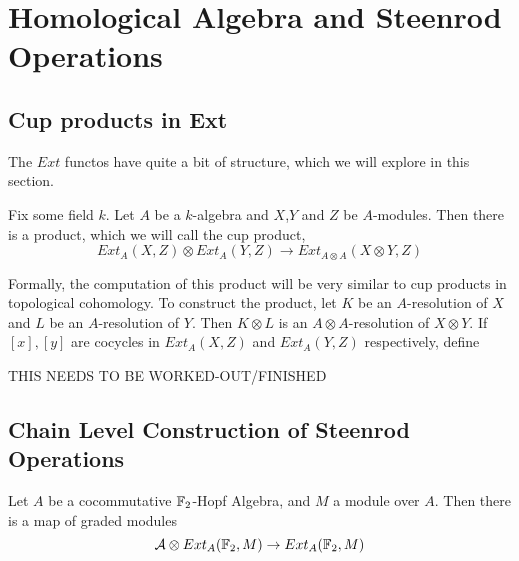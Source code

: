 

\section{Homological Algebra and Steenrod Operations}

\subsection{Cup products in Ext}
\label{sec:ExtStructure}

The $Ext$ functos have quite a bit of structure, which we will explore in this section.  

Fix some field $k$. 
Let $A$ be a $k$-algebra and $X$,$Y$ and $Z$ be $A$-modules.
Then there is a product, which we will call the cup product, 
\[Ext_A(X,Z)\otimes Ext_A(Y,Z)\to Ext_{A\otimes A}(X\otimes Y,Z)\]

Formally, the computation of this product will be very similar to cup products in topological cohomology.  
To construct the product, let $K$ be an  $A$-resolution of $X$ and $L$ be an  $A$-resolution of $Y$.  
Then $K\otimes L$ is an $A\otimes A$-resolution of $X\otimes Y$.  
If $[x],[y]$ are cocycles in $Ext_A(X,Z)$ and $Ext_A(Y,Z)$ respectively, define

THIS NEEDS TO BE WORKED-OUT/FINISHED


\subsection{Chain Level Construction of Steenrod Operations}
\label{sec:SteenrodConstruction}

\begin{Theorem}
  Let $A$ be a cocommutative $\mathbb{F}_2$-Hopf Algebra, and $M$ a module over $A$.  
  Then there is a map of graded modules
  \[\mathcal{A}\otimes Ext_A(\mathbb{F}_2,M)\to Ext_A(\mathbb{F}_2,M)\]
\end{Theorem}

